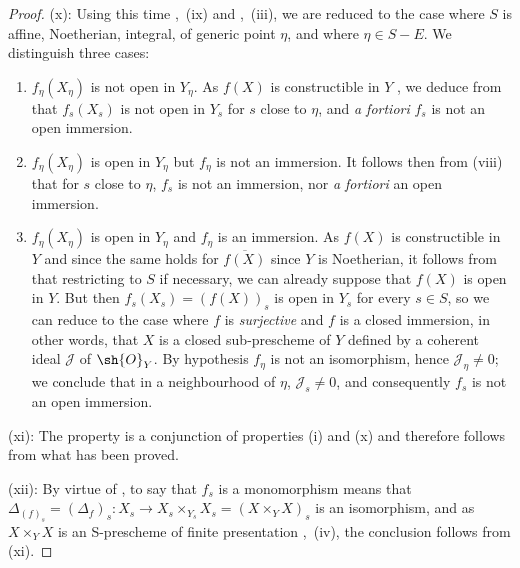 \begin{proof}
(x): Using this time ,~(ix) and ,~(iii), we are reduced to the case where $S$ is affine, Noetherian, integral, of generic point $\eta$, and where $\eta\in S-E$.
We distinguish three cases:
\begin{enumerate}[label=\upshape{$\arabic{enumi}^\circ$}]
  \item $f_\eta(X_\eta)$ is not open in $Y_\eta$.
  As $f(X)$ is constructible in $Y$ , we deduce from  that $f_s(X_s)$ is not open in $Y_s$ for $s$ close to $\eta$, and \emph{a fortiori} $f_s$ is not an open immersion.

  \item $f_\eta(X_\eta)$ is open in $Y_\eta$ but $f_\eta$ is not an immersion.
  It follows then from (viii) that for $s$ close to $\eta$, $f_s$ is not an immersion, nor \emph{a fortiori} an open immersion.

  \item $f_\eta(X_\eta)$ is open in $Y_\eta$ and $f_\eta$ is an immersion.
  As $f(X)$ is constructible in $Y$  and since the same holds for $\overline{f(X)}$ since $Y$ is Noetherian, it follows from  that restricting to $S$ if necessary, we can already suppose that $f(X)$ is open in $Y$.
  But then $f_s(X_s)=(f(X))_s$ is open in $Y_s$ for every $s\in S$, so we can reduce to the case where $f$ is \emph{surjective} and $f$ is a closed immersion, in other words, that $X$ is a closed sub-prescheme of $Y$ defined by a coherent ideal $\mathscr{J}$ of $\sh{O}_Y$.
  By hypothesis $f_\eta$ is not an isomorphism, hence $\mathscr{J}_\eta\neq 0$; we conclude  that in a neighbourhood of $\eta$, $\mathscr{J}_s\neq 0$, and consequently $f_s$ is not an open immersion.
\end{enumerate}

(xi): The property is a conjunction of properties (i) and (x) and therefore follows from what has been proved.

(xii): By virtue of , to say that $f_s$ is a monomorphism means that $\Delta_{(f)_s}=(\Delta_f)_s:X_s\to X_s\times_{Y_s} X_s=(X\times_Y X)_s$ is an isomorphism, and as $X\times_Y X$ is an S-prescheme of finite presentation ,~(iv), the conclusion follows from (xi).
\end{proof}

